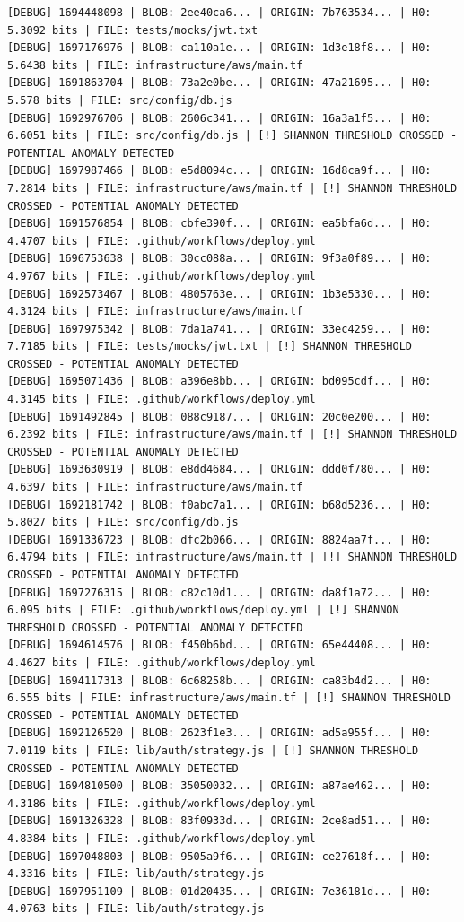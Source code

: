 \documentclass[12pt, a4paper, oneside]{report}
\begin{document}
\begin{lstlisting}[basicstyle=\tiny\ttfamily]
[DEBUG] 1694448098 | BLOB: 2ee40ca6... | ORIGIN: 7b763534... | H0: 5.3092 bits | FILE: tests/mocks/jwt.txt
[DEBUG] 1697176976 | BLOB: ca110a1e... | ORIGIN: 1d3e18f8... | H0: 5.6438 bits | FILE: infrastructure/aws/main.tf
[DEBUG] 1691863704 | BLOB: 73a2e0be... | ORIGIN: 47a21695... | H0: 5.578 bits | FILE: src/config/db.js
[DEBUG] 1692976706 | BLOB: 2606c341... | ORIGIN: 16a3a1f5... | H0: 6.6051 bits | FILE: src/config/db.js | [!] SHANNON THRESHOLD CROSSED - POTENTIAL ANOMALY DETECTED
[DEBUG] 1697987466 | BLOB: e5d8094c... | ORIGIN: 16d8ca9f... | H0: 7.2814 bits | FILE: infrastructure/aws/main.tf | [!] SHANNON THRESHOLD CROSSED - POTENTIAL ANOMALY DETECTED
[DEBUG] 1691576854 | BLOB: cbfe390f... | ORIGIN: ea5bfa6d... | H0: 4.4707 bits | FILE: .github/workflows/deploy.yml
[DEBUG] 1696753638 | BLOB: 30cc088a... | ORIGIN: 9f3a0f89... | H0: 4.9767 bits | FILE: .github/workflows/deploy.yml
[DEBUG] 1692573467 | BLOB: 4805763e... | ORIGIN: 1b3e5330... | H0: 4.3124 bits | FILE: infrastructure/aws/main.tf
[DEBUG] 1697975342 | BLOB: 7da1a741... | ORIGIN: 33ec4259... | H0: 7.7185 bits | FILE: tests/mocks/jwt.txt | [!] SHANNON THRESHOLD CROSSED - POTENTIAL ANOMALY DETECTED
[DEBUG] 1695071436 | BLOB: a396e8bb... | ORIGIN: bd095cdf... | H0: 4.3145 bits | FILE: .github/workflows/deploy.yml
[DEBUG] 1691492845 | BLOB: 088c9187... | ORIGIN: 20c0e200... | H0: 6.2392 bits | FILE: infrastructure/aws/main.tf | [!] SHANNON THRESHOLD CROSSED - POTENTIAL ANOMALY DETECTED
[DEBUG] 1693630919 | BLOB: e8dd4684... | ORIGIN: ddd0f780... | H0: 4.6397 bits | FILE: infrastructure/aws/main.tf
[DEBUG] 1692181742 | BLOB: f0abc7a1... | ORIGIN: b68d5236... | H0: 5.8027 bits | FILE: src/config/db.js
[DEBUG] 1691336723 | BLOB: dfc2b066... | ORIGIN: 8824aa7f... | H0: 6.4794 bits | FILE: infrastructure/aws/main.tf | [!] SHANNON THRESHOLD CROSSED - POTENTIAL ANOMALY DETECTED
[DEBUG] 1697276315 | BLOB: c82c10d1... | ORIGIN: da8f1a72... | H0: 6.095 bits | FILE: .github/workflows/deploy.yml | [!] SHANNON THRESHOLD CROSSED - POTENTIAL ANOMALY DETECTED
[DEBUG] 1694614576 | BLOB: f450b6bd... | ORIGIN: 65e44408... | H0: 4.4627 bits | FILE: .github/workflows/deploy.yml
[DEBUG] 1694117313 | BLOB: 6c68258b... | ORIGIN: ca83b4d2... | H0: 6.555 bits | FILE: infrastructure/aws/main.tf | [!] SHANNON THRESHOLD CROSSED - POTENTIAL ANOMALY DETECTED
[DEBUG] 1692126520 | BLOB: 2623f1e3... | ORIGIN: ad5a955f... | H0: 7.0119 bits | FILE: lib/auth/strategy.js | [!] SHANNON THRESHOLD CROSSED - POTENTIAL ANOMALY DETECTED
[DEBUG] 1694810500 | BLOB: 35050032... | ORIGIN: a87ae462... | H0: 4.3186 bits | FILE: .github/workflows/deploy.yml
[DEBUG] 1691326328 | BLOB: 83f0933d... | ORIGIN: 2ce8ad51... | H0: 4.8384 bits | FILE: .github/workflows/deploy.yml
[DEBUG] 1697048803 | BLOB: 9505a9f6... | ORIGIN: ce27618f... | H0: 4.3316 bits | FILE: lib/auth/strategy.js
[DEBUG] 1697951109 | BLOB: 01d20435... | ORIGIN: 7e36181d... | H0: 4.0763 bits | FILE: lib/auth/strategy.js
\end{lstlisting}
\end{document}
